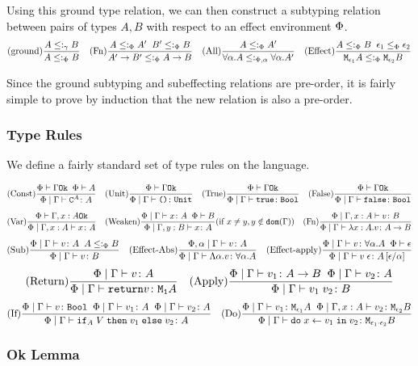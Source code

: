 \documentclass{Report}
\begin{document}
Using this ground type relation, we can then construct a subtyping relation between pairs of types $A, B$ with respect to an effect environment $\P$.
\[
    \treerule{ground}{A \subtype_{\ground} B}{A \subtypep B}
    \quad
    \treerule{Fn}{A \subtypep A' \s\s B' \subtypep B }{\fntype{A'}{B'} \subtypep \ab}
    \quad
    \treerule{All}{A\subtypep A'}{\all{\a}{A}\subtypepa\all{\a}{A'}}
    \quad
    \treerule{Effect}{A\subtypep B\s\s \e_1\subeffectp\e_2}{\M{\e_1}{A}\subtypep\M{\e_2}{B}}
\]

Since the ground subtyping and subeffecting relations are pre-order, it is fairly simple to prove by induction that the new relation is also a pre-order.


\subsubsection{Type Rules}
We define a fairly standard set of type rules on the language.

\[
    \treerule{Const}{\oke{\P}{\G}\s\s\wellformed{\P}{A}}{\gpetyperelation{\const{A}}{A}} 
    \quad
    \treerule{Unit}{\oke{\P}{\G}}{\gpetyperelation{\u}{\U}} 
    \quad
    \treerule{True}{\oke{\P}{\G}}{\gpetyperelation{\t}{\B}}
    \quad
    \treerule{False}{\oke{\P}{\G}}{\gpetyperelation{\f}{\B}}
\]
\[
\treerule{Var}{\oke{\P}{\gax}}{\etyperelation{\P}{\gax}{x}{A}}
\quad
\condtreerule{Weaken}{\etyperelation{\P}{\G}{x}{A}\s\s\wellformed{\P}{B}}{\etyperelation{\P}{\gby}{x}{A}}{x \neq y, y\notin\dom{\G}}
\quad
\treerule{Fn}{\etyperelation{\P}{\gax}{v}{B}}{\etyperelation{\P}{\G}{\lam{x}{A}{v}}{\ab}}
\]
\[
    \treerule{Sub}{\etyperelation{\P}{\G}{v}{A}\s\s A \subtypep B}{\etyperelation{\P}{\G}{v}{B}}
    \quad
    \treerule{Effect-Abs}{\etyperelation{\P,\a}{\G}{v}{A}}{\gpetyperelation{\elam{\a}{v}}{\all{\a}{A}}}
    \quad
    \treerule{Effect-apply}{\gpetyperelation{v}{\all{\a}A}\s\s\wellformed{\P}{\e}}{\gpetyperelation{\eapp{v}{\e}}{A\ssub{\a}{\e}}}
\]
\[
    \treerule{Return}{\gpetyperelation{v}{A}}{\gpetyperelation{\return{v}}{\moa}}
    \quad
    \treerule{Apply}{\gpetyperelation{v_1}{\ab}\s\s\gpetyperelation{v_2}{A}}{\gpetyperelation{\apply{v_1}{v_2}}{B}}
\]
\[
    \treerule{If}{\gpetyperelation{v}{\B} \s\s \gpetyperelation{v_1}{A}\s\s\gpetyperelation{v_2}{A}}{\gpetyperelation{\pifthenelse{A}{V}{v_1}{v_2}}{A}}
    \quad
    \treerule{Do}{\gpetyperelation{v_1}{\M{\e_1}{A}} \s\s \etyperelation{\P}{\gax}{v_2}{\M{\e_2}{B}}}{\gpetyperelation{\doin{x}{v_1}{v_2}}{\M{\e_1 \dot \e_2}{B}}}
\]

\subsubsection{Ok Lemma}
\end{document}
